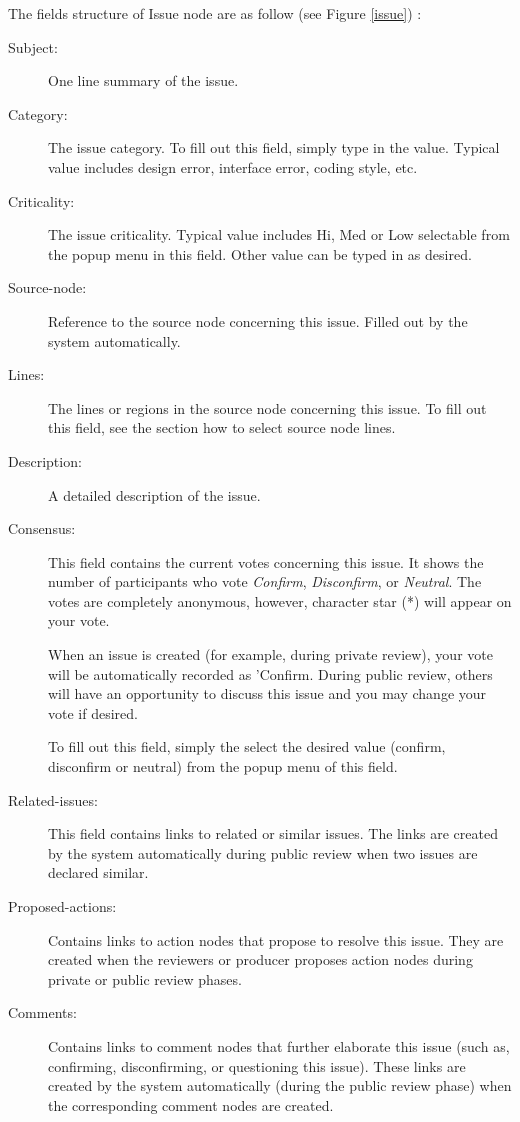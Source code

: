 \noindent The fields structure of Issue node are as follow (see Figure
\ref{issue}) :
\begin{description}
\item [Subject:] One line summary of the issue.
\item [Category:] The issue category. To fill out this field, simply
type in the value. Typical value includes design
error, interface error, coding style, etc.
\item [Criticality:] The issue criticality. Typical value includes
Hi, Med or Low selectable from the popup menu in this field. Other
value can be typed in as desired.
\item [Source-node:] Reference to the source node concerning this issue.
Filled out by the system automatically.
\item [Lines:]  The lines or regions in the source node concerning
this issue. To fill out this field, see the section how to
select source node lines. 
\item [Description:] A detailed description of the issue.
\item [Consensus:]  This field contains the current
votes concerning this issue. It shows the number of
participants who vote {\it Confirm}, {\it Disconfirm}, or {\it
Neutral}. The votes are completely anonymous, however, character star
(*) will appear on your vote.

When an issue is created (for example, during private review), your
vote will be automatically recorded as 'Confirm.
During public review, others will have an opportunity to discuss this
issue and you may change your vote if desired.

To fill out this field, simply the select the desired value (confirm,
disconfirm or neutral) from the popup menu of this field.

\item [Related-issues:] This field contains links to
related or similar issues. The links are created by the system
automatically during public review when two issues are declared similar.

\item [Proposed-actions:] Contains links to action
nodes that propose to resolve this issue. They are created when the
reviewers or producer proposes action nodes during private or public
review phases. 

\item [Comments:] Contains links to comment nodes that further elaborate
this issue (such as, confirming, disconfirming, or questioning this
issue). These links are created by the system automatically
(during the public review phase) when the corresponding comment nodes are
created. 
\end{description}

